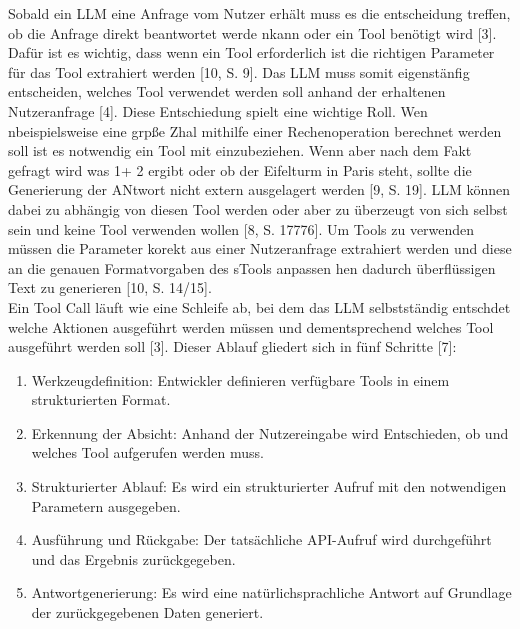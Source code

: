 Sobald ein LLM eine Anfrage vom Nutzer erhält muss es die entscheidung treffen, ob die Anfrage direkt beantwortet werde nkann oder ein Tool benötigt wird [3]. Dafür
ist es wichtig, dass wenn ein Tool erforderlich ist die richtigen Parameter für das Tool extrahiert werden [10, S. 9]. Das LLM muss somit eigenstänfig entscheiden,
welches Tool verwendet werden soll anhand der erhaltenen Nutzeranfrage [4]. Diese Entschiedung spielt eine wichtige Roll. Wen nbeispielsweise eine grpße Zhal mithilfe
einer Rechenoperation berechnet werden soll ist es notwendig ein Tool mit einzubeziehen. Wenn aber nach dem Fakt gefragt wird was 1+ 2 ergibt oder ob der Eifelturm
in Paris steht, sollte die Generierung der ANtwort nicht extern ausgelagert werden [9, S. 19]. LLM können dabei zu abhängig von diesen Tool werden oder aber zu 
überzeugt von sich selbst sein und keine Tool verwenden wollen [8, S. 17776]. Um Tools zu verwenden müssen die Parameter korekt aus einer Nutzeranfrage extrahiert 
werden und diese an die genauen Formatvorgaben des sTools anpassen hen dadurch überflüssigen Text zu generieren [10, S. 14/15]. \\
Ein Tool Call läuft wie eine Schleife ab, bei dem das LLM selbstständig entschdet welche Aktionen ausgeführt werden müssen und dementsprechend welches Tool ausgeführt
werden soll [3]. Dieser Ablauf gliedert sich in fünf Schritte [7]:

\begin{enumerate}
    \item Werkzeugdefinition: Entwickler definieren verfügbare Tools in einem strukturierten Format.
    \item Erkennung der Absicht: Anhand der Nutzereingabe wird Entschieden, ob und welches Tool aufgerufen werden muss.
    \item Strukturierter Ablauf: Es wird ein strukturierter Aufruf mit den notwendigen Parametern ausgegeben.
    \item Ausführung und Rückgabe: Der tatsächliche API-Aufruf wird durchgeführt und das Ergebnis zurückgegeben.
    \item Antwortgenerierung: Es wird eine natürlichsprachliche Antwort auf Grundlage der zurückgegebenen Daten generiert.
\end{enumerate}

